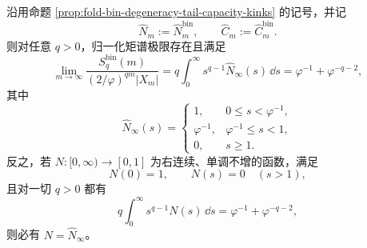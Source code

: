 \begin{theorem}\label{thm:killo-fold-bin-two-kink-mellin-uniqueness}
沿用命题 \ref{prop:fold-bin-degeneracy-tail-capacity-kinks} 的记号，并记
\[
\widehat N_m:=\widehat N_m^{\mathrm{bin}},
\qquad
\widehat C_m:=\widehat C_m^{\mathrm{bin}}.
\]
则对任意 \(q>0\)，归一化矩谱极限存在且满足
\[
\lim_{m\to\infty}
\frac{S_q^{\mathrm{bin}}(m)}{(2/\varphi)^{qm}|X_m|}
=
q\int_{0}^{\infty}s^{q-1}\widehat N_\infty(s)\,\dd s
=
\varphi^{-1}+\varphi^{-q-2},
\]
其中
\[
\widehat N_\infty(s)=
\begin{cases}
1, & 0\le s<\varphi^{-1},\\[2pt]
\varphi^{-1}, & \varphi^{-1}\le s<1,\\[2pt]
0, & s\ge 1.
\end{cases}
\]
反之，若 \(N:[0,\infty)\to[0,1]\) 为右连续、单调不增的函数，满足
\[
N(0)=1,
\qquad
N(s)=0\quad(s>1),
\]
且对一切 \(q>0\) 都有
\[
q\int_{0}^{\infty}s^{q-1}N(s)\,\dd s
=
\varphi^{-1}+\varphi^{-q-2},
\]
则必有 \(N=\widehat N_\infty\)。
\end{theorem}

